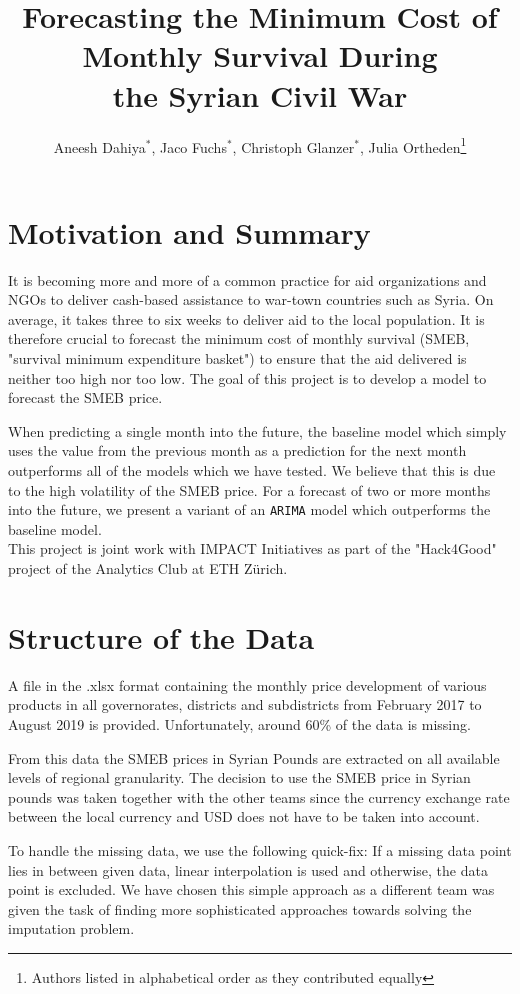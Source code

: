 \documentclass[11pt,a4paper]{article}
\title{Forecasting the Minimum Cost of Monthly Survival During\\the Syrian Civil War}
\author{Aneesh Dahiya${}^\ast$, Jaco Fuchs${}^\ast$, Christoph Glanzer${}^\ast$, Julia Ortheden\thanks{Authors listed in alphabetical order as they contributed equally}}
\date{}
\begin{document}
	\maketitle
	
	\section*{Motivation and Summary}
	It is becoming more and more of a common practice for aid organizations and NGOs to deliver cash-based assistance to war-town countries such as Syria. On average, it takes three to six weeks to deliver aid to the local population. It is therefore crucial to forecast the minimum cost of monthly survival (SMEB, "survival minimum expenditure basket") to ensure that the aid delivered is neither too high nor too low. The goal of this project is to develop a model to forecast the SMEB price. 
	
	When predicting a single month into the future, the baseline model which simply uses the value from the previous month as a prediction for the next month outperforms all of the models which we have tested. We believe that this is due to the high volatility of the SMEB price. For a forecast of two or more months into the future, we present a variant of an \texttt{ARIMA} model which outperforms the baseline model.\\
	
	This project is joint work with IMPACT Initiatives as part of the "Hack4Good" project of the Analytics Club at ETH Zürich.
	
	\section*{Structure of the Data}
	A file in the .xlsx format containing the monthly price development of various products in all governorates, districts and subdistricts from February 2017 to August 2019 is provided. Unfortunately, around 60\% of the data is missing.
	
	From this data the SMEB prices in Syrian Pounds are extracted on all available levels of regional granularity. The decision to use the SMEB price in Syrian pounds was taken together with the other teams since the currency exchange rate between the local currency and USD does not have to be taken into account.
	
	To handle the missing data, we use the following quick-fix: If a missing data point lies in between given data, linear interpolation is used and otherwise, the data point is excluded. We have chosen this simple approach as a different team was given the task of finding more sophisticated approaches towards solving the imputation problem.
	
\end{document}
